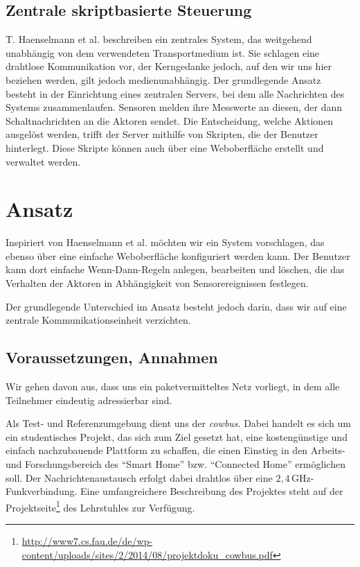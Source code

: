 \documentclass{IEEEtran}
\begin{document}
    \subsection{Zentrale skriptbasierte Steuerung}
        T. Haenselmann et al. \cite{haenselmann2007skriptbasierte}
        beschreiben ein zentrales System, das weitgehend
        unabhängig von dem verwendeten Transportmedium ist.
        Sie schlagen eine drahtlose Kommunikation vor,
        der Kerngedanke jedoch, auf den wir uns hier beziehen werden,
        gilt jedoch medienunabhängig.
        Der grundlegende Ansatz besteht in der Einrichtung eines zentralen
        Servers, bei dem alle Nachrichten des Systems zusammenlaufen.
        Sensoren melden ihre Messwerte an diesen, der dann Schaltnachrichten
        an die Aktoren sendet.
        Die Entscheidung, welche Aktionen ausgelöst werden, trifft der Server
        mithilfe von Skripten, die der Benutzer hinterlegt.
        Diese Skripte können auch über eine Weboberfläche erstellt und
        verwaltet werden.


\section{Ansatz}
    Inspiriert von Haenselmann et al. \cite{haenselmann2007skriptbasierte}
    möchten wir ein System vorschlagen,
    das ebenso über eine einfache Weboberfläche konfiguriert werden kann.
    Der Benutzer kann dort einfache Wenn-Dann-Regeln anlegen, bearbeiten und
    löschen, die das Verhalten der Aktoren in Abhängigkeit von Sensorereignissen
    festlegen.

    Der grundlegende Unterschied im Ansatz besteht jedoch darin,
    dass wir auf eine zentrale Kommunikationseinheit verzichten.

    \subsection{Voraussetzungen, Annahmen}
        Wir gehen davon aus, dass uns ein paketvermitteltes Netz vorliegt,
        in dem alle Teilnehmer eindeutig adressierbar sind.

        Als Test- und Referenzumgebung dient uns der \emph{cowbus}.
        Dabei handelt es sich um ein studentisches Projekt,
        das sich zum Ziel gesetzt hat,
        eine kostengünstige und einfach nachzubauende Plattform zu schaffen,
        die einen Einstieg in den Arbeits- und Forschungsbereich des
        \enquote{Smart Home} bzw. \enquote{Connected Home} ermöglichen soll.
        Der Nachrichtenaustausch erfolgt dabei drahtlos über eine
        $2,4$\,GHz-Funkverbindung. Eine umfangreichere Beschreibung des Projektes
        steht auf der
        Projektseite\footnote{\url{http://www7.cs.fau.de/de/wp-content/uploads/sites/2/2014/08/projektdoku_cowbus.pdf}}
        des Lehrstuhles zur Verfügung.
\end{document}

